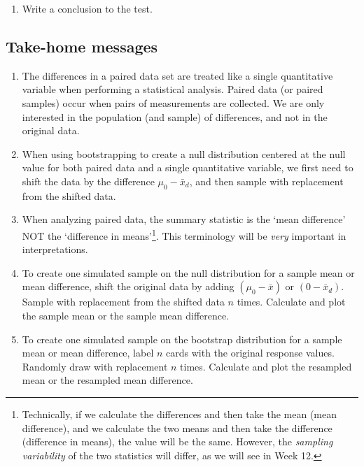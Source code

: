 \documentclass[
]{report}
\providecommand{\tightlist}{%
  \setlength{\itemsep}{0pt}\setlength{\parskip}{0pt}}
\begin{document}
\vspace{.7in}

\begin{enumerate}
\def\labelenumi{\arabic{enumi}.}
\setcounter{enumi}{10}
\tightlist
\item
  Write a conclusion to the test.
\end{enumerate}

\vspace{0.8in}

\subsection{Take-home messages}\label{take-home-messages-1}

\begin{enumerate}
\def\labelenumi{\arabic{enumi}.}
\item
  The differences in a paired data set are treated like a single quantitative variable when performing a statistical analysis. Paired data (or paired samples) occur when pairs of measurements are collected. We are only interested in the population (and sample) of differences, and not in the original data.
\item
  When using bootstrapping to create a null distribution centered at the null value for both paired data and a single quantitative variable, we first need to shift the data by the difference \(\mu_0 - \bar{x}_d\), and then sample with replacement from the shifted data.
\item
  When analyzing paired data, the summary statistic is the `mean difference' NOT the `difference in means'\footnote{Technically, if we calculate the differences and then take the mean (mean difference), and we calculate the two means and then take the difference (difference in means), the value will be the same. However, the \emph{sampling variability} of the two statistics will differ, as we will see in Week 12.}. This terminology will be \emph{very} important in interpretations.
\item
  To create one simulated sample on the null distribution for a sample mean or mean difference, shift the original data by adding \((\mu_0 - \bar{x})\) or \((0 - \bar{x}_d)\). Sample with replacement from the shifted data \(n\) times. Calculate and plot the sample mean or the sample mean difference.
\item
  To create one simulated sample on the bootstrap distribution for a sample mean or mean difference, label \(n\) cards with the original response values. Randomly draw with replacement \(n\) times. Calculate and plot the resampled mean or the resampled mean difference.
\end{enumerate}
\end{document}
